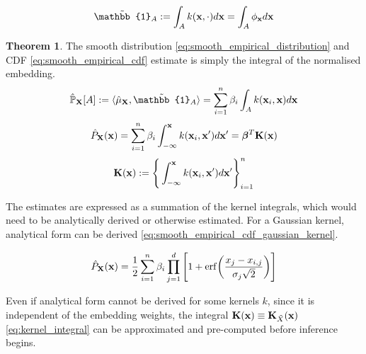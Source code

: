 \documentclass[twoside]{article} \usepackage{aistats2017}
\theoremstyle{definition}
\theoremstyle{theorem}
\newtheorem{theorem}{Theorem}[section]
\newcommand{\rv}[1]{{#1}}
\newcommand{\ds}[1]{\tilde{#1}}
\newcommand{\inner}[2]{{\langle #1, #2 \rangle}}
\begin{document}
		\begin{equation}
			\tilde{\mathbb{1}}_{A} := \int_{A} k(\bvec{x}, \cdot) d\bvec{x} = \int_{A} \phi_{\bvec{x}} d\bvec{x}
		\label{eq:indicator_smooth}
		\end{equation}
		
		\begin{theorem} \label{thm:smooth_empirical_distribution_and_cdf}
			The smooth distribution \eqref{eq:smooth_empirical_distribution} and CDF \eqref{eq:smooth_empirical_cdf} estimate is simply the integral of the normalised embedding.
			\begin{equation}
				\hat{\mathbb{P}}_{\bvec{\rv{X}}}[A] := \inner{\hat{\mu}_{\bvec{\rv{X}}}}{\tilde{\mathbb{1}}_{A}} = \sum_{i = 1}^{n} \beta_{i} \int_{A}  k(\bvec{x}_{i}, \bvec{x}) d\bvec{x}
			\label{eq:smooth_empirical_distribution}
			\end{equation}	
			\begin{equation}
				\hat{P}_{\bvec{\rv{X}}}(\bvec{x}) = \sum_{i = 1}^{n} \beta_{i} \int_{-\bvec{\infty}}^{\bvec{x}}  k(\bvec{x}_{i}, \bvec{x}') d\bvec{x}' = \bm{\beta}^{T} \bvec{K}(\bvec{x})
			\label{eq:smooth_empirical_cdf}
			\end{equation}
			\begin{equation}
				\mathbf{K}(\mathbf{x}) := \Bigg\{ \int_{-\mathbf{\infty}}^{\mathbf{x}}  k(\mathbf{x}_{i}, \mathbf{x}') d\mathbf{x}' \Bigg\}_{i = 1}^{n}
			\label{eq:kernel_integral}
			\end{equation}
		\end{theorem}

		The estimates are expressed as a summation of the kernel integrals, which would need to be analytically derived or otherwise estimated. For a Gaussian kernel, analytical form can be derived \eqref{eq:smooth_empirical_cdf_gaussian_kernel}.

		\begin{equation}
			\hat{P}_{\bvec{\rv{X}}}(\bvec{x}) = \frac{1}{2} \sum_{i = 1}^{n} \beta_{i} \prod_{j = 1}^{d} \Bigg[1 + \mathrm{erf}\bigg(\frac{x_{j} - x_{i, j}}{\sigma_{j} \sqrt{2}}\bigg)\Bigg]
		\label{eq:smooth_empirical_cdf_gaussian_kernel}
		\end{equation}

		Even if analytical form cannot be derived for some kernels $k$, since it is independent of the embedding weights, the integral $\bvec{K}(\bvec{x}) \equiv \bvec{K}_{\ds{X}}(\bvec{x})$ \eqref{eq:kernel_integral} can be approximated and pre-computed before inference begins.
\end{document}
